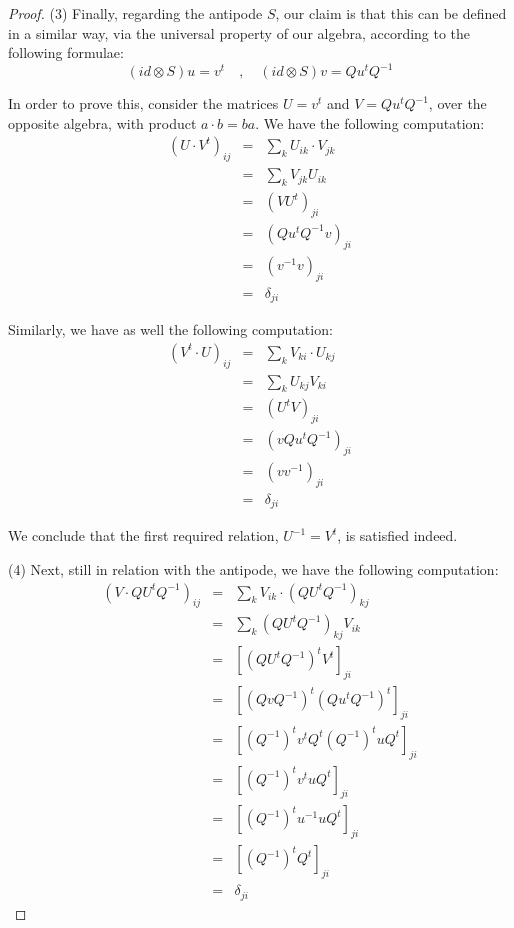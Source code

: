 \documentclass[12pt]{amsbook}
\begin{document}
\begin{proof}
\medskip

(3) Finally, regarding the antipode $S$, our claim is that this can be defined in a similar way, via the universal property of our algebra, according to the following formulae:
$$(id\otimes S)u=v^t\quad,\quad (id\otimes S)v=Qu^tQ^{-1}$$

In order to prove this, consider the matrices $U=v^t$ and $V=Qu^tQ^{-1}$, over the opposite algebra, with product $a\cdot b=ba$. We have the following computation:
\begin{eqnarray*}
(U\cdot V^t)_{ij}
&=&\sum_kU_{ik}\cdot V_{jk}\\
&=&\sum_kV_{jk}U_{ik}\\
&=&(VU^t)_{ji}\\
&=&(Qu^tQ^{-1}v)_{ji}\\
&=&(v^{-1}v)_{ji}\\
&=&\delta_{ji}
\end{eqnarray*}

Similarly, we have as well the following computation:
\begin{eqnarray*}
(V^t\cdot U)_{ij}
&=&\sum_kV_{ki}\cdot U_{kj}\\
&=&\sum_kU_{kj}V_{ki}\\
&=&(U^tV)_{ji}\\
&=&(vQu^tQ^{-1})_{ji}\\
&=&(vv^{-1})_{ji}\\
&=&\delta_{ji}
\end{eqnarray*}

We conclude that the first required relation, $U^{-1}=V^t$, is satisfied indeed. 

\medskip

(4) Next, still in relation with the antipode, we have the following computation:
\begin{eqnarray*}
(V\cdot QU^tQ^{-1})_{ij}
&=&\sum_kV_{ik}\cdot(QU^tQ^{-1})_{kj}\\
&=&\sum_k(QU^tQ^{-1})_{kj}V_{ik}\\
&=&[(QU^tQ^{-1})^tV^t]_{ji}\\
&=&[(QvQ^{-1})^t(Qu^tQ^{-1})^t]_{ji}\\
&=&[(Q^{-1})^tv^tQ^t(Q^{-1})^tuQ^t]_{ji}\\
&=&[(Q^{-1})^tv^tuQ^t]_{ji}\\
&=&[(Q^{-1})^tu^{-1}uQ^t]_{ji}\\
&=&[(Q^{-1})^tQ^t]_{ji}\\
&=&\delta_{ji}
\end{eqnarray*}


\end{proof}
\end{document}
